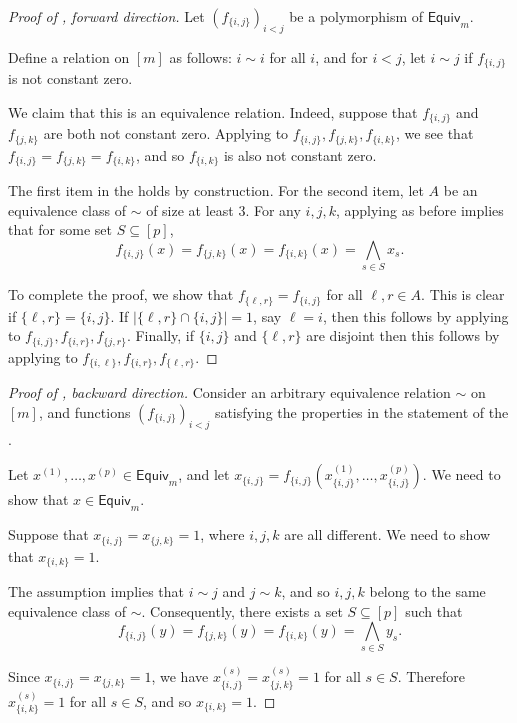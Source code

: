 \documentclass{article}
\providecommand{\Equiv}{\mathsf{Equiv}}
\theoremstyle{definition}
\theoremstyle{remark}
\begin{document}
\begin{proof}[Proof of , forward direction]
Let $(f_{\{i,j\}})_{i < j}$ be a polymorphism of $\Equiv_m$.

Define a relation on $[m]$ as follows: $i \sim i$ for all $i$, and for $i < j$, let $i \sim j$ if $f_{\{i,j\}}$ is not constant zero.

We claim that this is an equivalence relation. Indeed, suppose that $f_{\{i,j\}}$ and $f_{\{j,k\}}$ are both not constant zero. Applying  to $f_{\{i,j\}},f_{\{j,k\}},f_{\{i,k\}}$, we see that $f_{\{i,j\}} = f_{\{j,k\}} = f_{\{i,k\}}$, and so $f_{\{i,k\}}$ is also not constant zero.

The first item in the  holds by construction. For the second item, let $A$ be an equivalence class of $\sim$ of size at least $3$. For any $i,j,k$, applying  as before implies that for some set $S \subseteq [p]$,
\[
 f_{\{i,j\}}(x) = f_{\{j,k\}}(x) = f_{\{i,k\}}(x) = \bigwedge_{s \in S} x_s.
\]

To complete the proof, we show that $f_{\{\ell,r\}} = f_{\{i,j\}}$ for all $\ell,r \in A$. This is clear if $\{\ell,r\} = \{i,j\}$. If $|\{\ell,r\} \cap \{i,j\}| = 1$, say $\ell = i$, then this follows by applying  to $f_{\{i,j\}},f_{\{i,r\}},f_{\{j,r\}}$. Finally, if $\{i,j\}$ and $\{\ell,r\}$ are disjoint then this follows by applying  to $f_{\{i,\ell\}},f_{\{i,r\}},f_{\{\ell,r\}}$.
\end{proof}

\begin{proof}[Proof of , backward direction]
Consider an arbitrary equivalence relation $\sim$ on $[m]$, and functions $(f_{\{i,j\}})_{i < j}$ satisfying the properties in the statement of the .

Let $x^{(1)},\dots,x^{(p)} \in \Equiv_m$, and let $x_{\{i,j\}} = f_{\{i,j\}}(x^{(1)}_{\{i,j\}},\dots,x^{(p)}_{\{i,j\}})$. We need to show that $x \in \Equiv_m$.

Suppose that $x_{\{i,j\}} = x_{\{j,k\}} = 1$, where $i,j,k$ are all different. We need to show that $x_{\{i,k\}} = 1$.

The assumption implies that $i \sim j$ and $j \sim k$, and so $i,j,k$ belong to the same equivalence class of $\sim$. Consequently, there exists a set $S \subseteq [p]$ such that
\[
 f_{\{i,j\}}(y) = f_{\{j,k\}}(y) = f_{\{i,k\}}(y) = \bigwedge_{s \in S} y_s.
\]

Since $x_{\{i,j\}} = x_{\{j,k\}} = 1$, we have $x^{(s)}_{\{i,j\}} = x^{(s)}_{\{j,k\}} = 1$ for all $s \in S$. Therefore $x^{(s)}_{\{i,k\}} = 1$ for all $s \in S$, and so $x_{\{i,k\}} = 1$.
\end{proof}
\end{document}
